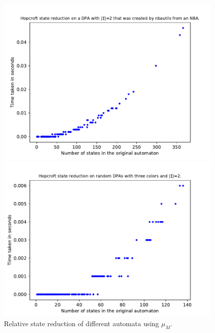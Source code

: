 \begin{figure}
\begin{minipage}{0.49\textwidth}
		\includegraphics[page=6,height=.3\textheight]{../data/analysis/hopcroft/detnbaut_ap1.pdf} 
		\caption{Relative state reduction of different automata using $\mu_M$.}
		\label{fig:general:empirical_moore_size_hist}
	\end{minipage}
	\hfill
	\begin{minipage}{0.49\textwidth}
		\includegraphics[page=1,height=.3\textheight]{../data/analysis/hopcroft/gendet_ap1.pdf} 

\end{minipage}
\end{figure}
